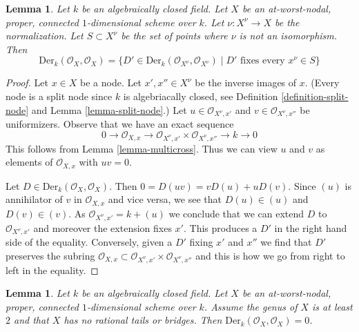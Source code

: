 \documentclass{stacks-project}
\theoremstyle{plain}
\newtheorem{lemma}[subsection]{Lemma}
\theoremstyle{definition}
\theoremstyle{remark}
\numberwithin{equation}{subsection}
\begin{document}
\begin{lemma}
\label{lemma-nodal-vector-fields}
Let $k$ be an algebraically closed field.
Let $X$ be an at-worst-nodal, proper, connected
$1$-dimensional scheme over $k$. Let $\nu : X^\nu \to X$ be the normalization.
Let $S \subset X^\nu$ be the set of points where $\nu$ is not an
isomorphism. Then
$$
\text{Der}_k(\mathcal{O}_X, \mathcal{O}_X) =
\{D' \in \text{Der}_k(\mathcal{O}_{X^\nu}, \mathcal{O}_{X^\nu}) \mid
D' \text{ fixes every }x^\nu \in S\}
$$
\end{lemma}

\begin{proof}
Let $x \in X$ be a node. Let $x', x'' \in X^\nu$ be the inverse images
of $x$. (Every node is a split node since $k$ is algebriacally closed, see
Definition \ref{definition-split-node} and
Lemma \ref{lemma-split-node}.)
Let $u \in \mathcal{O}_{X^\nu, x'}$ and $v \in \mathcal{O}_{X^\nu, x''}$
be uniformizers. Observe that we have an exact sequence
$$
0 \to \mathcal{O}_{X, x} \to
\mathcal{O}_{X^\nu, x'} \times \mathcal{O}_{X^\nu, x''} \to k \to 0
$$
This follows from Lemma \ref{lemma-multicross}.
Thus we can view $u$ and $v$ as elements of $\mathcal{O}_{X, x}$
with $uv = 0$.

\medskip\noindent
Let $D \in \text{Der}_k(\mathcal{O}_X, \mathcal{O}_X)$. Then
$0 = D(uv) = vD(u) + uD(v)$. Since $(u)$ is annihilator of
$v$ in $\mathcal{O}_{X, x}$ and vice versa, we see that $D(u) \in (u)$ and
$D(v) \in (v)$. As $\mathcal{O}_{X^\nu, x'} = k + (u)$
we conclude that we can extend $D$ to $\mathcal{O}_{X^\nu, x'}$
and moreover the extension fixes $x'$. This produces a $D'$
in the right hand side of the equality. Conversely, given a
$D'$ fixing $x'$ and $x''$ we find that $D'$ preserves
the subring $\mathcal{O}_{X, x} \subset
\mathcal{O}_{X^\nu, x'} \times \mathcal{O}_{X^\nu, x''}$
and this is how we go from right to left in the equality.
\end{proof}

\begin{lemma}
\label{lemma-stable-vector-fields}
Let $k$ be an algebraically closed field.
Let $X$ be an at-worst-nodal, proper, connected
$1$-dimensional scheme over $k$. Assume the genus of $X$ is at least
$2$ and that $X$ has no rational tails
or bridges. Then
$\text{Der}_k(\mathcal{O}_X, \mathcal{O}_X) = 0$.
\end{lemma}
\end{document}
